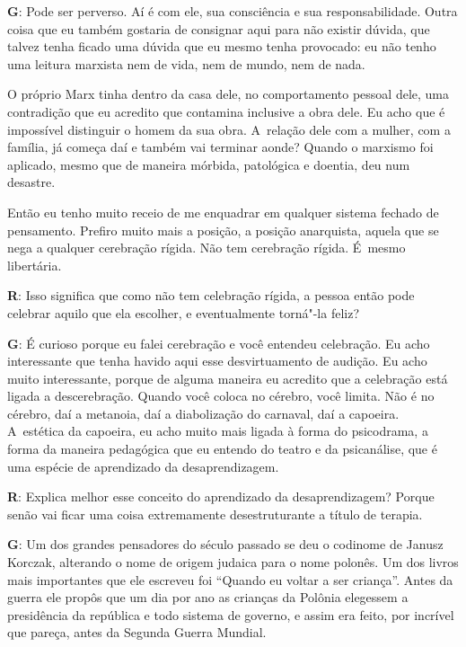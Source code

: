 \textbf{G}: Pode ser perverso. Aí é com ele, sua consciência e sua
responsabilidade. Outra coisa que eu também gostaria de consignar aqui
para não existir dúvida, que talvez tenha ficado uma dúvida que eu mesmo
tenha provocado: eu não tenho uma leitura marxista nem de vida, nem de
mundo, nem de nada.

 

O próprio Marx tinha dentro da casa dele, no comportamento pessoal dele,
uma contradição que eu acredito que contamina inclusive a obra dele. Eu
acho que é impossível distinguir o homem da sua obra. A~relação dele com
a mulher, com a família, já começa daí e também vai terminar aonde?
Quando o marxismo foi aplicado, mesmo que de maneira mórbida, patológica
e doentia, deu num desastre.

 

Então eu tenho muito receio de me enquadrar em qualquer sistema fechado
de pensamento. Prefiro muito mais a posição, a posição anarquista,
aquela que se nega a qualquer cerebração rígida. Não tem cerebração
rígida. É~mesmo libertária.

 

\textbf{R}: Isso significa que como não tem celebração rígida, a pessoa
então pode celebrar aquilo que ela escolher, e eventualmente torná"-la
feliz?

 

\textbf{G}: É curioso porque eu falei cerebração e você entendeu
celebração. Eu acho interessante que tenha havido aqui esse
desvirtuamento de audição. Eu acho muito interessante, porque de alguma
maneira eu acredito que a celebração está ligada a descerebração.
Quando você coloca no cérebro, você limita. Não é no cérebro, daí a
metanoia, daí a diabolização do carnaval, daí a capoeira. A~estética da
capoeira, eu acho muito mais ligada à forma do psicodrama, a forma da
maneira pedagógica que eu entendo do teatro e da psicanálise, que é uma
espécie de aprendizado da desaprendizagem.

 

\textbf{R}: Explica melhor esse conceito do aprendizado da
desaprendizagem? Porque senão vai ficar uma coisa extremamente
desestruturante a título de terapia.

 

\textbf{G}: Um dos grandes pensadores do século passado se deu o
codinome de Janusz Korczak, alterando o nome de origem judaica para o
nome polonês. Um dos livros mais importantes que ele escreveu foi
``Quando eu voltar a ser criança''. Antes da guerra ele propôs que um
dia por ano as crianças da Polônia elegessem a presidência da república
e todo sistema de governo, e assim era feito, por incrível que pareça,
antes da Segunda Guerra Mundial.

